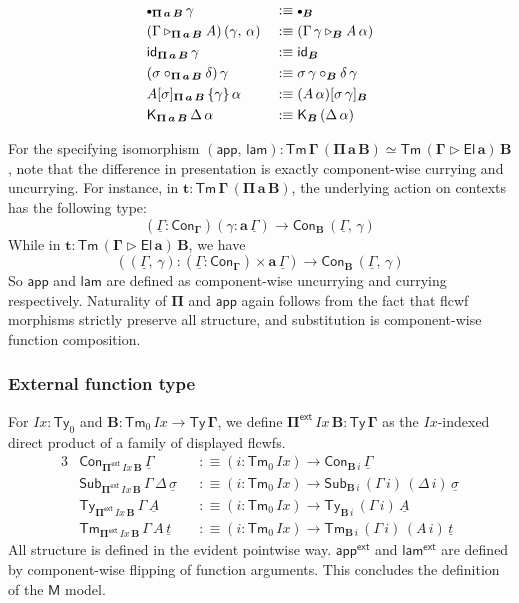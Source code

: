 \documentclass[12pt,a4paper,twoside,openany]{book}
\theoremstyle{remark}
\theoremstyle{definition}
\theoremstyle{theorem}
\newcommand{\mi}[1]{\mathit{#1}}
\newcommand{\ms}[1]{\mathsf{#1}}
\newcommand{\bs}[1]{\boldsymbol{#1}}
\newcommand{\Ix}{\mi{Ix}}
\newcommand{\id}{\mathsf{id}}
\newcommand{\Con}{\mathsf{Con}}
\newcommand{\Sub}{\mathsf{Sub}}
\newcommand{\Tm}{\mathsf{Tm}}
\newcommand{\Ty}{\mathsf{Ty}}
\newcommand{\El}{\mathsf{El}}
\newcommand{\ext}{\triangleright}
\newcommand{\emptycon}{\scaleobj{.75}\bullet}
\newcommand{\Pie}{\Pi^{\mathsf{ext}}}
\newcommand{\appe}{\mathsf{app^{ext}}}
\newcommand{\lame}{\mathsf{lam^{ext}}}
\newcommand{\K}{\mathsf{K}}
\newcommand{\bGamma}{\bs{\Gamma}}
\newcommand{\ba}{\bs{a}}
\newcommand{\bB}{\bs{B}}
\newcommand{\bM}{\bs{\mathsf{M}}}
\newcommand{\ul}[1]{\underline{#1}}
\newcommand{\ulGamma}{\ul{\Gamma}}
\newcommand{\ulsigma}{\ul{\sigma}}
\newcommand{\ult}{\ul{t}}
\newcommand{\ulA}{\ul{A}}
\newcommand{\app}{\ms{app}}
\newcommand{\lam}{\ms{lam}}
\newcommand{\defn}{:\equiv}
\begin{document}
\begin{alignat*}{3}
  &\emptycon_{\bs{\Pi\,a\,B}}\,\gamma &&\defn \emptycon_{\bB}\\
  &(\Gamma \ext_{\bs{\Pi\,a\,B}} A)\,(\gamma,\,\alpha) &&\defn (\Gamma\,\gamma \ext_{\bB} A\,\alpha)\\
  &\id_{\bs{\Pi\,a\,B}}\,\gamma &&\defn \id_{\bB}\\
  &(\sigma \circ_{\bs{\Pi\,a\,B}} \delta)\,\gamma &&\defn \sigma\,\gamma \circ_{\bB} \delta\,\gamma\\
  &A[\sigma]_{\bs{\Pi\,a\,B}}\,\{\gamma\}\,\alpha &&\defn (A\,\alpha)[\sigma\,\gamma]_{\bB}\\
  &\K_{\bs{\Pi\,a\,B}}\,\Delta\,\alpha &&\defn \K_{\bB}\,(\Delta\,\alpha)
\end{alignat*}

For the specifying isomorphism $\bs{(\app,\,\lam) : \Tm\,\Gamma\,(\Pi\,a\,B)
  \simeq \Tm\,(\Gamma \ext \El\,a)\,B}$, note that the difference in
presentation is exactly component-wise currying and uncurrying. For instance, in
$\bs{t : \Tm\,\Gamma\,(\Pi\,a\,B)}$, the underlying action on contexts has the following
type:
\[
  (\ulGamma : \Con_{\bGamma})(\gamma : \ba\,\ulGamma) \to \Con_{\bB}\,(\ulGamma,\,\gamma)
\]
While in $\bs{t : \Tm\,(\Gamma \ext \El\,a)\,B}$, we have
\[
  ((\ulGamma,\,\gamma) : (\ulGamma : \Con_{\bGamma}) \times \ba\,\ulGamma) \to \Con_{\bB}\,(\ulGamma,\,\gamma)
\]
So $\bs{\app}$ and $\bs{\lam}$ are defined as component-wise uncurrying and
currying respectively.  Naturality of $\bs{\Pi}$ and $\bs{\app}$ again follows
from the fact that flcwf morphisms strictly preserve all structure, and
substitution is component-wise function composition.

\subsubsection{External function type}

For $\Ix : \Ty_0$ and $\bB : \Tm_0\,\Ix \to \bs{\Ty\,\Gamma}$, we define
$\bs{\Pie}\,\Ix\,\bB : \bs{\Ty\,\Gamma}$ as the $\Ix$-indexed direct product of
a family of displayed flcwfs.
\begin{alignat*}{3}
  & \Con_{\bs{\Pie}\,\Ix\,\bB}\,\ulGamma &&\defn (i : \Tm_0\,\Ix) \to \Con_{\bB\,i}\,\ulGamma\\
  & \Sub_{\bs{\Pie}\,\Ix\,\bB}\,\Gamma\,\Delta\,\ulsigma &&\defn (i : \Tm_0\,\Ix) \to \Sub_{\bB\,i}\,(\Gamma\,i)\,(\Delta\,i)\,\ulsigma\\
  &  \Ty_{\bs{\Pie}\,\Ix\,\bB}\,\Gamma\,\ulA &&\defn (i : \Tm_0\,\Ix) \to \Ty_{\bB\,i}\,(\Gamma\,i)\,\ulA\\
  &  \Tm_{\bs{\Pie}\,\Ix\,\bB}\,\Gamma\,A\,\ult &&\defn (i : \Tm_0\,\Ix) \to \Tm_{\bB\,i}\,(\Gamma\,i)\,(A\,i)\,\ult
\end{alignat*}
All structure is defined in the evident pointwise way. $\bs{\appe}$ and
$\bs{\lame}$ are defined by component-wise flipping of function arguments. This
concludes the definition of the $\bM$ model.
\end{document}

